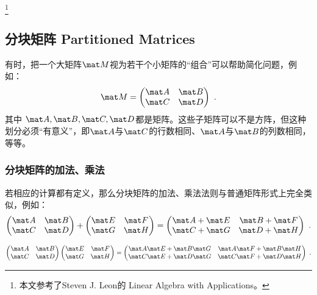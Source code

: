 
\begin{issues}
\issueDraft
\end{issues}
\footnote{本文参考了Steven J. Leon的 Linear Algebra with Applications。}

\subsection{分块矩阵 Partitioned Matrices}

有时，把一个大矩阵$\mat M$视为若干个小矩阵的“组合”可以帮助简化问题，例如：
\begin{equation}
\mat M = 
\begin{pmatrix}
\mat A & \mat B\\
\mat C & \mat D\\
\end{pmatrix}~.
\end{equation}
其中 $\mat A, \mat B, \mat C, \mat D$都是矩阵。这些子矩阵可以不是方阵，但这种划分必须“有意义”，即$\mat A$与$\mat C$的行数相同、$\mat A$与$\mat B$的列数相同，等等。

\subsubsection{分块矩阵的加法、乘法}
若相应的计算都有定义，那么分块矩阵的加法、乘法法则与普通矩阵形式上完全类似，例如：
\begin{equation}
\begin{pmatrix}
\mat A & \mat B\\
\mat C & \mat D\\
\end{pmatrix}
+
\begin{pmatrix}
\mat E & \mat F\\
\mat G & \mat H\\
\end{pmatrix}
=
\begin{pmatrix}
\mat A +\mat E & \mat B +\mat F\\
\mat C +\mat G & \mat D +\mat H\\
\end{pmatrix}~.
\end{equation}

\begin{equation}
\begin{pmatrix}
\mat A & \mat B\\
\mat C & \mat D\\
\end{pmatrix}
\begin{pmatrix}
\mat E & \mat F\\
\mat G & \mat H\\
\end{pmatrix}
=
\begin{pmatrix}
\mat A \mat E +\mat B \mat G & \mat A \mat F +\mat B \mat H \\
\mat C \mat E +\mat D \mat G  & \mat C \mat F +\mat D \mat H \\
\end{pmatrix}~.
\end{equation}

